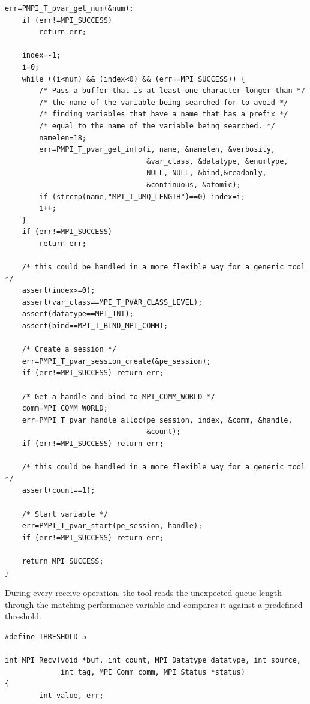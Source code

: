 \begin{example}
\begin{lstlisting}[language={[MPI]C},basicstyle=\lstsmall]
    err=PMPI_T_pvar_get_num(&num);
    if (err!=MPI_SUCCESS)
        return err;

    index=-1;
    i=0;
    while ((i<num) && (index<0) && (err==MPI_SUCCESS)) {
        /* Pass a buffer that is at least one character longer than */
        /* the name of the variable being searched for to avoid */
        /* finding variables that have a name that has a prefix */
        /* equal to the name of the variable being searched. */
        namelen=18;
        err=PMPI_T_pvar_get_info(i, name, &namelen, &verbosity,
                                 &var_class, &datatype, &enumtype,
                                 NULL, NULL, &bind,&readonly,
                                 &continuous, &atomic);
        if (strcmp(name,"MPI_T_UMQ_LENGTH")==0) index=i;
        i++;
    }
    if (err!=MPI_SUCCESS)
        return err;

    /* this could be handled in a more flexible way for a generic tool */
    assert(index>=0);
    assert(var_class==MPI_T_PVAR_CLASS_LEVEL);
    assert(datatype==MPI_INT);
    assert(bind==MPI_T_BIND_MPI_COMM);

    /* Create a session */
    err=PMPI_T_pvar_session_create(&pe_session);
    if (err!=MPI_SUCCESS) return err;

    /* Get a handle and bind to MPI_COMM_WORLD */
    comm=MPI_COMM_WORLD;
    err=PMPI_T_pvar_handle_alloc(pe_session, index, &comm, &handle,
                                 &count);
    if (err!=MPI_SUCCESS) return err;

    /* this could be handled in a more flexible way for a generic tool */
    assert(count==1);

    /* Start variable */
    err=PMPI_T_pvar_start(pe_session, handle);
    if (err!=MPI_SUCCESS) return err;

    return MPI_SUCCESS;
}
\end{lstlisting}

During every receive operation, the tool reads the unexpected queue length
through the matching performance variable and compares it against a
predefined threshold.

\begin{lstlisting}[language={[MPI]C},basicstyle=\lstsmall]
#define THRESHOLD 5

int MPI_Recv(void *buf, int count, MPI_Datatype datatype, int source,
             int tag, MPI_Comm comm, MPI_Status *status)
{
        int value, err;


\end{lstlisting}
\end{example}
